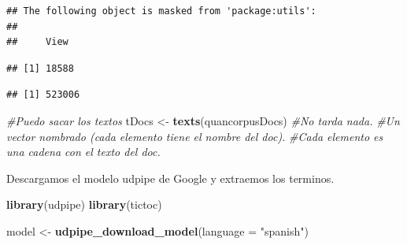 \documentclass[]{article}
\newenvironment{Shaded}{\begin{snugshade}}{\end{snugshade}}
\newcommand{\CommentTok}[1]{\textcolor[rgb]{0.56,0.35,0.01}{\textit{#1}}}
\newcommand{\DataTypeTok}[1]{\textcolor[rgb]{0.13,0.29,0.53}{#1}}
\newcommand{\KeywordTok}[1]{\textcolor[rgb]{0.13,0.29,0.53}{\textbf{#1}}}
\newcommand{\NormalTok}[1]{#1}
\newcommand{\OperatorTok}[1]{\textcolor[rgb]{0.81,0.36,0.00}{\textbf{#1}}}
\newcommand{\StringTok}[1]{\textcolor[rgb]{0.31,0.60,0.02}{#1}}
\begin{document}
\begin{verbatim}
## The following object is masked from 'package:utils':
## 
##     View
\end{verbatim}

\begin{Shaded}
\end{Shaded}

\begin{verbatim}
## [1] 18588
\end{verbatim}

\begin{Shaded}
\end{Shaded}

\begin{verbatim}
## [1] 523006
\end{verbatim}

\begin{Shaded}
\begin{Highlighting}[]
\CommentTok{#Puedo sacar los textos }
\NormalTok{tDocs <-}\StringTok{ }\KeywordTok{texts}\NormalTok{(quancorpusDocs) }\CommentTok{#No tarda nada. }
                       \CommentTok{#Un vector nombrado (cada elemento tiene el nombre del doc). }
                       \CommentTok{#Cada elemento es una cadena con el texto del doc.}
\end{Highlighting}
\end{Shaded}

Descargamos el modelo udpipe de Google y extraemos los terminos.

\begin{Shaded}
\begin{Highlighting}[]
\KeywordTok{library}\NormalTok{(udpipe)}
\KeywordTok{library}\NormalTok{(tictoc)}

\NormalTok{model <-}\StringTok{ }\KeywordTok{udpipe_download_model}\NormalTok{(}\DataTypeTok{language =} \StringTok{"spanish"}\NormalTok{)}
\end{Highlighting}
\end{Shaded}
\end{document}
